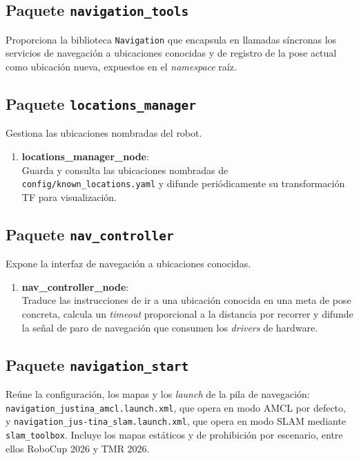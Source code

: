 \subsection{Paquete \texttt{navigation\_tools}}
Proporciona la biblioteca \texttt{Navigation} que encapsula en llamadas síncronas los servicios de navegación a ubicaciones conocidas y de registro de la pose actual como ubicación nueva, expuestos en el \textit{namespace} raíz.

\subsection{Paquete \texttt{locations\_manager}}
Gestiona las ubicaciones nombradas del robot.

\begin{enumerate}
    \item \textbf{locations\_manager\_node}: \\
    Guarda y consulta las ubicaciones nombradas de \texttt{config/known\_locations.yaml} y difunde periódicamente su transformación TF para visualización.
\end{enumerate}

\subsection{Paquete \texttt{nav\_controller}}
Expone la interfaz de navegación a ubicaciones conocidas.

\begin{enumerate}
    \item \textbf{nav\_controller\_node}: \\
    Traduce las instrucciones de ir a una ubicación conocida en una meta de pose concreta, calcula un \textit{timeout} proporcional a la distancia por recorrer y difunde la señal de paro de navegación que consumen los \textit{drivers} de hardware.
\end{enumerate}

\subsection{Paquete \texttt{navigation\_start}}
Reúne la configuración, los mapas y los \textit{launch} de la pila de navegación: \texttt{navigation\_\allowbreak{}justina\_amcl.launch.xml}, que opera en modo AMCL por defecto, y \texttt{navigation\_jus-\allowbreak{}tina\_slam.launch.xml}, que opera en modo SLAM mediante \texttt{slam\_toolbox}. Incluye los mapas estáticos y de prohibición por escenario, entre ellos RoboCup 2026 y TMR 2026.

